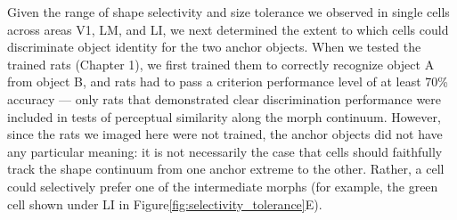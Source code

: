 Given the range of shape selectivity and size tolerance we observed in single cells across areas V1, LM, and LI, we next determined the extent to which cells could discriminate object identity for the two anchor objects. When we tested the trained rats (Chapter 1), we first trained them to correctly recognize object A from object B, and rats had to pass a criterion performance level of at least 70\% accuracy --- only rats that demonstrated clear discrimination performance were included in tests of perceptual similarity along the morph continuum. However, since the rats we imaged here were not trained, the anchor objects did not have any particular meaning: it is not necessarily the case that cells should faithfully track the shape continuum from one anchor extreme to the other. Rather, a cell could selectively prefer one of the intermediate morphs (for example, the green cell shown under LI in Figure\ref{fig:selectivity_tolerance}E). 


